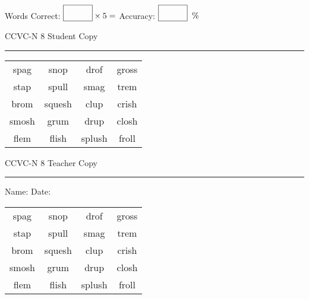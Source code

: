 \documentclass{memoir}
\begin{document}
\small

Words Correct: $\fbox{\phantom{\huge 100}} \times 5 = $ Accuracy: $\fbox{\phantom{\huge 100}}\;\; \%$ 

\vfill

\newpage


\footnotesize \noindent
CCVC-N 8 \hfill Student Copy
\smallskip
\hrule

\Large

\setlength{\tabcolsep}{14pt}
\def\arraystretch{3}

{\selectfont


\begin{vplace}[0.5]
\begin{center}
\begin{tabular}{cccc}
spag          & snop & drof & gross                    \\
stap & spull & smag & trem \\
brom          & squesh & clup             & crish \\
smosh & grum       & drup & closh            \\
flem & flish             & splush & froll \\
\end{tabular}
\end{center}
\end{vplace}

}

\newpage

\footnotesize \noindent
CCVC-N 8 \hfill Teacher Copy
\smallskip
\hrule

\small

\vfill

\noindent
Name: \underline{\hspace{1.75in}} \hfill Date: \underline{\hspace{1in}}

\Large

{\selectfont


\begin{vplace}[0.5]
\begin{center}
\begin{tabular}{cccc}
spag          & snop & drof & gross                    \\
stap & spull & smag & trem \\
brom          & squesh & clup             & crish \\
smosh & grum       & drup & closh            \\
flem & flish             & splush & froll \\
\end{tabular}
\end{center}
\end{vplace}



}
\end{document}
